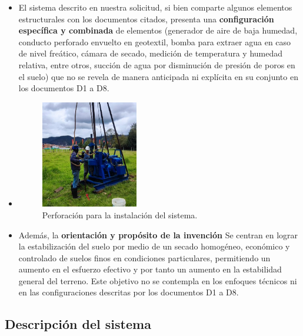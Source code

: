 \documentclass[12pt]{article}
\begin{document}
\begin{itemize}
    \item El sistema descrito en nuestra solicitud, si bien comparte algunos elementos estructurales con los documentos citados, presenta una \textbf{configuración específica y combinada} de elementos (generador de aire de baja humedad, conducto perforado envuelto en geotextil, bomba para extraer agua en caso de nivel freático, cámara de secado, medición de temperatura y humedad relativa, entre otros, succión de agua por disminución de presión de poros en el suelo) que no se revela de manera anticipada ni explícita en su conjunto en los documentos D1 a D8.
    \item \begin{figure}[h]
    \centering
    \includegraphics[width=0.4\textwidth]{images/perforacion.JPG}
    \caption{Perforación para la instalación del sistema.}
    \label{fig:perforacion}
    \end{figure}

    \item Además, la \textbf{orientación y propósito de la invención} Se centran en lograr la estabilización del suelo por medio de un secado homogéneo, económico y controlado de suelos finos en condiciones particulares, permitiendo un aumento en el esfuerzo efectivo y por tanto un aumento en la estabilidad general del terreno. Este objetivo no se contempla en los enfoques técnicos ni en las configuraciones descritas por los documentos D1 a D8.
\end{itemize}

\subsection*{Descripción del sistema}
\end{document}
